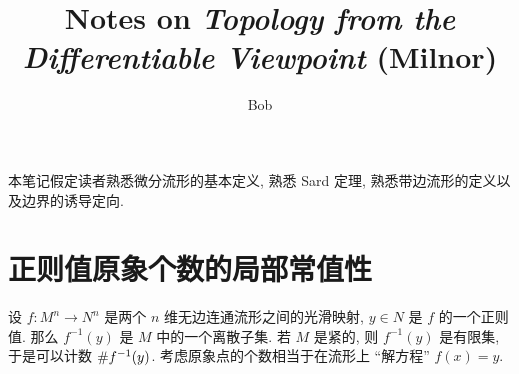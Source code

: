 \documentclass[12pt,a4paper]{article}
\begin{document}
\title{Notes on \textit{Topology from the Differentiable Viewpoint} (Milnor)}
\author{Bob}
\date{}
\maketitle

\tableofcontents
\vspace{3em}

本笔记假定读者熟悉微分流形的基本定义, 
熟悉 Sard 定理, 熟悉带边流形的定义以及边界的诱导定向.
\newpage

\section{正则值原象个数的局部常值性}
设 $f: M^n\to N^n$ 是两个 $n$ 维无边连通流形之间的光滑映射, 
$y\in N$ 是 $f$ 的一个正则值. 那么 $f^{-1}(y)$ 是 $M$ 中的一个离散子集. 
若 $M$ 是紧的, 则 $f^{-1}(y)$ 是有限集, 于是可以计数 $\setlength\parindent{0pt}\#f^{-1}(y)$. 
考虑原象点的个数相当于在流形上 “解方程” $f(x) = y$.
\end{document}
